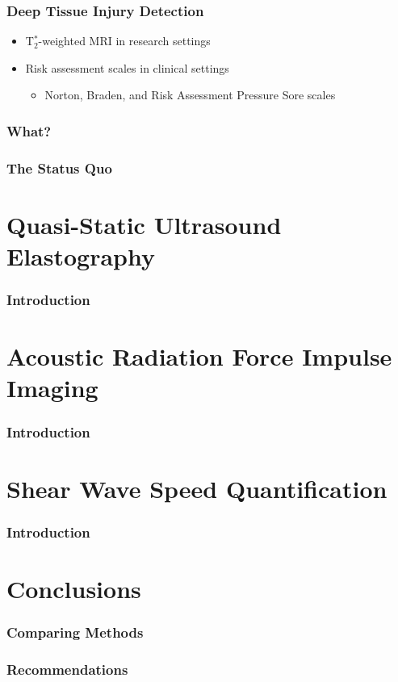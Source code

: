 \documentclass{beamer}
\begin{document}
		\begin{frame}
			\frametitle{Deep Tissue Injury Detection}
			\begin{itemize}
				\item T$_2^*$-weighted MRI in research settings
				\item Risk assessment scales in clinical settings
				\begin{itemize}
					\item Norton, Braden, and Risk Assessment Pressure Sore scales
				\end{itemize}
			\end{itemize}
		\end{frame}

		\begin{frame}
			\frametitle{What?}
		\end{frame}
		\begin{frame}
			\frametitle{The Status Quo}
		\end{frame}

	\section[QS USE]{Quasi-Static Ultrasound Elastography}
		\begin{frame}
			\frametitle{Introduction}
		\end{frame}

	\section[ARFI]{Acoustic Radiation Force Impulse Imaging}
		\begin{frame}
			\frametitle{Introduction}
		\end{frame}

	\section[Shear]{Shear Wave Speed Quantification}
		\begin{frame}
			\frametitle{Introduction}
		\end{frame}

	\section{Conclusions}
		\begin{frame}
			\frametitle{Comparing Methods}
		\end{frame}
		\begin{frame}
			\frametitle{Recommendations}
		\end{frame}
\end{document}
